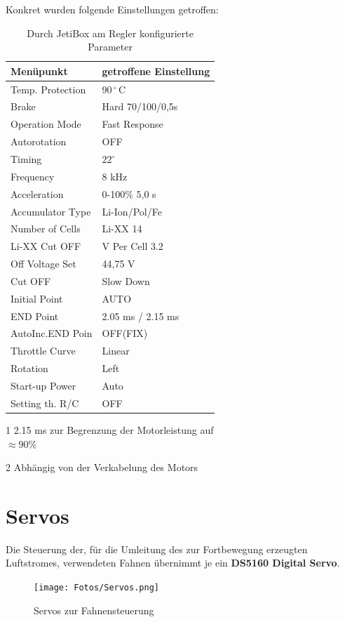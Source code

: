 Konkret wurden folgende Einstellungen getroffen:\\
\begin{table}[h]
\centering
\begin{threeparttable}
    
    \begin{tabular}{|l|l|}
    \hline
     Menüpunkt & getroffene Einstellung \\\hline
     Temp. Protection & $90\,^\circ\,\textrm{C}$\\
     Brake & Hard 70/100/0,5s\\
     Operation Mode & Fast Response\\
     Autorotation & OFF\\
     Timing & $22^\circ$\\
     Frequency & 8 kHz\\
     Acceleration & 0-100\% 5,0 s\\
     Accumulator Type & Li-Ion/Pol/Fe\\
     Number of Cells & Li-XX 14\\
     Li-XX Cut OFF & V Per Cell 3.2\\
     Off Voltage Set & 44,75 V\\
     Cut OFF & Slow Down\\
     Initial Point & AUTO\\
     END Point & 2.05 ms / 2.15 ms \tnote{1}\\
     AutoInc.END Poin & OFF(FIX)\\
     Throttle Curve & Linear\\
     Rotation & Left \tnote{2}\\
     Start-up Power & Auto\\
     Setting th. R/C & OFF\\\hline
    \end{tabular}
    \begin{tablenotes}\footnotesize 
        \item[1] 2.15 ms zur Begrenzung der Motorleistung auf \\$\approx 90\%$
        \item[2] Abhängig von der Verkabelung des Motors 
        \end{tablenotes}
    \end{threeparttable}
    \caption{Durch JetiBox am Regler konfigurierte Parameter}
\end{table}

\newpage
\section{Servos}
Die Steuerung der, für die Umleitung des zur Fortbewegung erzeugten Luftstromes, verwendeten Fahnen übernimmt je ein \textbf{DS5160 Digital Servo}.
\begin{figure}[h]
    \centering
    \texttt{[image: Fotos/Servos.png]}
    \caption{Servos zur Fahnensteuerung}
\end{figure}

\newpage